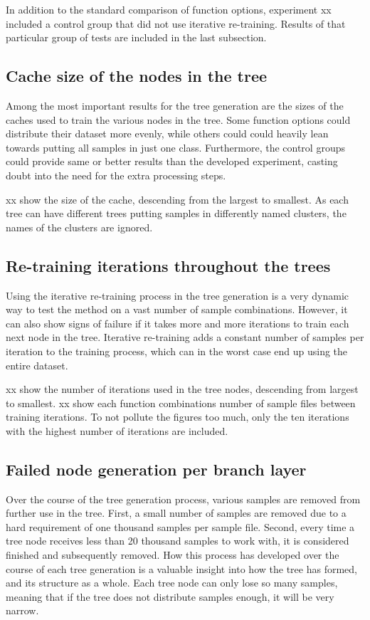 In addition to the standard comparison of function options, experiment xx included a control group that did not use iterative re-training.
Results of that particular group of tests are included in the last subsection.

\subsection{Cache size of the nodes in the tree}
Among the most important results for the tree generation are the sizes of the caches used to train the various nodes in the tree.
Some function options could distribute their dataset more evenly, while others could could heavily lean towards putting all samples in just one class.
Furthermore, the control groups could provide same or better results than the developed experiment, casting doubt into the need for the extra processing steps.

xx show the size of the cache, descending from the largest to smallest.
As each tree can have different trees putting samples in differently named clusters, the names of the clusters are ignored.

\subsection{Re-training iterations throughout the trees}
Using the iterative re-training process in the tree generation is a very dynamic way to test the method on a vast number of sample combinations.
However, it can also show signs of failure if it takes more and more iterations to train each next node in the tree.
Iterative re-training adds a constant number of samples per iteration to the training process, which can in the worst case end up using the entire dataset.

xx show the number of iterations used in the tree nodes, descending from largest to smallest.
xx show each function combinations number of sample files between training iterations.
To not pollute the figures too much, only the ten iterations with the highest number of iterations are included.

\subsection{Failed node generation per branch layer}
Over the course of the tree generation process, various samples are removed from further use in the tree.
First, a small number of samples are removed due to a hard requirement of one thousand samples per sample file.
Second, every time a tree node receives less than 20 thousand samples to work with, it is considered finished and subsequently removed.
How this process has developed over the course of each tree generation is a valuable insight into how the tree has formed, and its structure as a whole.
Each tree node can only lose so many samples, meaning that if the tree does not distribute samples enough, it will be very narrow.

